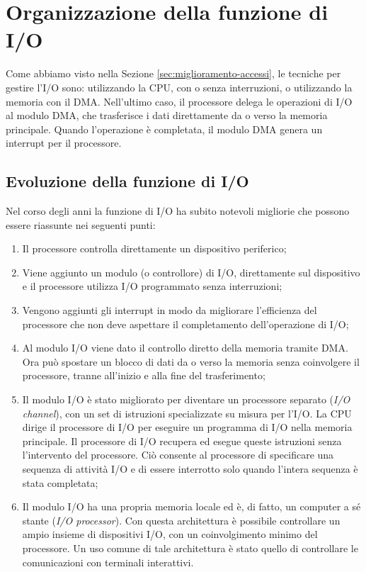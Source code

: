 \section{Organizzazione della funzione di I/O}
Come abbiamo visto nella Sezione \ref{sec:miglioramento-accessi}, le tecniche per gestire l'I/O sono: utilizzando la CPU, con o senza interruzioni, o utilizzando la memoria con il DMA.
Nell'ultimo caso, il processore delega le operazioni di I/O al modulo DMA, che trasferisce i dati direttamente da o verso la memoria principale. Quando l'operazione è completata, il modulo DMA genera un interrupt per il processore.

\subsection*{Evoluzione della funzione di I/O}
Nel corso degli anni la funzione di I/O ha subito notevoli migliorie che possono essere riassunte nei seguenti punti:
\begin{enumerate}
    \item Il processore controlla direttamente un dispositivo periferico;
  \item Viene aggiunto un modulo (o controllore) di I/O, direttamente sul dispositivo e il processore utilizza I/O programmato senza interruzioni;
  \item Vengono aggiunti gli interrupt in modo da migliorare l'efficienza del processore che non deve aspettare il completamento dell'operazione di I/O;
  \item Al modulo I/O viene dato il controllo diretto della memoria tramite DMA. Ora può spostare un blocco di dati da o verso la memoria senza coinvolgere il processore, tranne all'inizio e alla fine del trasferimento;
  \item Il modulo I/O è stato migliorato per diventare un processore separato (\textit{I/O channel}), con un set di istruzioni specializzate su misura per l'I/O. La CPU dirige il processore di I/O per eseguire un programma di I/O nella memoria principale. Il processore di I/O recupera ed esegue queste istruzioni senza l'intervento del processore. Ciò consente al processore di specificare una sequenza di attività I/O e di essere interrotto solo quando l'intera sequenza è stata completata;
  \item Il modulo I/O ha una propria memoria locale ed è, di fatto, un computer a sé stante (\textit{I/O processor}). Con questa architettura è possibile controllare un ampio insieme di dispositivi I/O, con un coinvolgimento minimo del processore. Un uso comune di tale architettura è stato quello di controllare le comunicazioni con terminali interattivi.
\end{enumerate}

